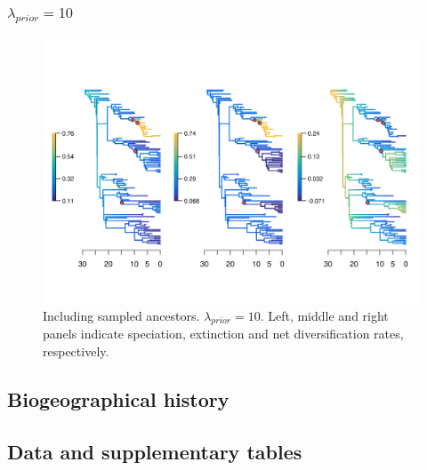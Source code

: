 \documentclass[a4paper, 12pt]{article}
\begin{document}
\subsubsection{$\lambda_{prior} = 10$}

\begin{figure}[H]
  \centering
  \includegraphics[width = \linewidth]{figures/diversification/sensitivity-analyses-with-sampled-ancestors/shifts-10/sensitivity-analysis-with-sampled-ancestors-10.png}
  \caption{Including sampled ancestors. $\lambda_{prior} = 10$. Left, middle and right panels indicate speciation, extinction and net diversification rates, respectively.}
  \label{fig-full-10}
\end{figure}


\newpage
\begin{landscape}
\section{Biogeographical history}
\subsection{Data and supplementary tables}



\newpage


\newpage

\end{landscape}
\end{document}
